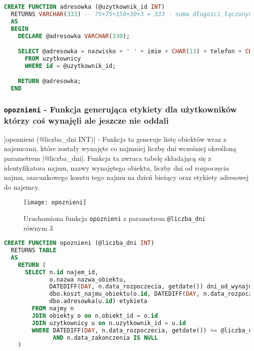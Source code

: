 \begin{lstlisting}[language=SQL, caption={Skrypt tworzący funkcję skalarną \texttt{adresowka}}, label={lst:function-adresowka}]
CREATE FUNCTION adresowka (@uzytkownik_id INT)
  RETURNS VARCHAR(333) -- 75+75+150+30+3 = 333 - suma długości łączonych pól
  AS
  BEGIN
    DECLARE @adresowka VARCHAR(330);

    SELECT @adresowka = nazwisko + ' ' + imie + CHAR(13) + telefon + CHAR(13) + adres
      FROM uzytkownicy
      WHERE id = @uzytkownik_id;

    RETURN @adresowka;
  END
\end{lstlisting}

\subsubsection{\texttt{opoznieni} - Funkcja generująca etykiety dla użytkowników którzy coś wynajęli ale jeszcze nie oddali}

|opoznieni (@liczba_dni INT)| - Funkcja ta generuje listę obiektów wraz z najemcami, które zostały wynajęte co najmniej liczbę dni wcześniej określoną parametrem |@liczba_dni|. Funkcja ta zwraca tabelę składającą się z identyfikatora najmu, nazwy wynajętego obiektu, liczby dni od rozpoczęcia najmu, szacunkowego kosztu tego najmu na dzień bieżący oraz etykiety adresowej do najemcy.

\begin{figure}[h]
	\centering
    \texttt{[image: opoznieni]}
	\caption{Uruchomiona funkcja \texttt{opoznieni} z parametrem \texttt{@liczba\_dni} równym 3}
	\label{fig:opoznieni}
\end{figure}

\begin{lstlisting}[language=SQL, caption={Skrypt tworzący funkcję tabelarną \texttt{opoznieni}}, label={lst:function-opoznieni}]
CREATE FUNCTION opoznieni (@liczba_dni INT)
  RETURNS TABLE
  AS
    RETURN (
      SELECT n.id najem_id,
             o.nazwa nazwa_obiektu,
             DATEDIFF(DAY, n.data_rozpoczecia, getdate()) dni_od_wynajmu,
             dbo.koszt_najmu_obiektu(o.id, DATEDIFF(DAY, n.data_rozpoczecia, getdate()) + 1) szacunkowy_koszt_najmu,
             dbo.adresowka(u.id) etykieta
        FROM najmy n
        JOIN obiekty o on n.obiekt_id = o.id
        JOIN uzytkownicy u on n.uzytkownik_id = u.id
        WHERE DATEDIFF(DAY, n.data_rozpoczecia, getdate()) >= @liczba_dni
              AND n.data_zakonczenia IS NULL
    )
\end{lstlisting}